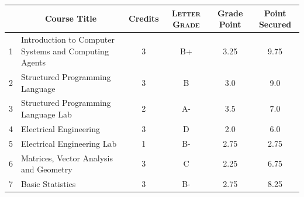 \documentclass[11pt]{article}
\newcommand*{\numtwo}[1]{\pgfmathprintnumber[
                    fixed, precision=2, fixed zerofill=true]{#1}}
\begin{document}
                \begin{center}
                    \renewcommand{\arraystretch}{1.08}
                    
                \begin{tabular}{|c|l|c|>{\scshape}c|c|c|}
                \hline  \rule[-1ex]{0pt}{3.5ex} {\centering{\bf Course Code}} &  \multicolumn{1}{c|}{\textbf{Course Title}}  & {\bf Credits} & {\bf Letter Grade} & {\bf Grade Point} & {\bf Point Secured}  \\ 
                \hline   1 &  Introduction to Computer Systems and Computing Agents		 & 3 & B+ & 3.25 & 9.75 \\ %
                \hline   2 &  Structured Programming Language		 & 3 & B & 3.0 & 9.0 \\ %
                \hline   3 &  Structured Programming Language Lab		 & 2 & A- & 3.5 & 7.0 \\ %
                \hline   4 &  Electrical Engineering		 & 3 & D & 2.0 & 6.0 \\ %
                \hline   5 &  Electrical Engineering Lab		 & 1 & B- & 2.75 & 2.75 \\ %
                \hline   6 &  Matrices, Vector Analysis and Geometry		 & 3 & C & 2.25 & 6.75 \\ %
                \hline   7 &  Basic Statistics		 & 3 & B- & 2.75 & 8.25 \\ %

\hline                %
                \end{tabular}
                \end{center}
                \renewcommand{\arraystretch}{1.03}
\end{document}
